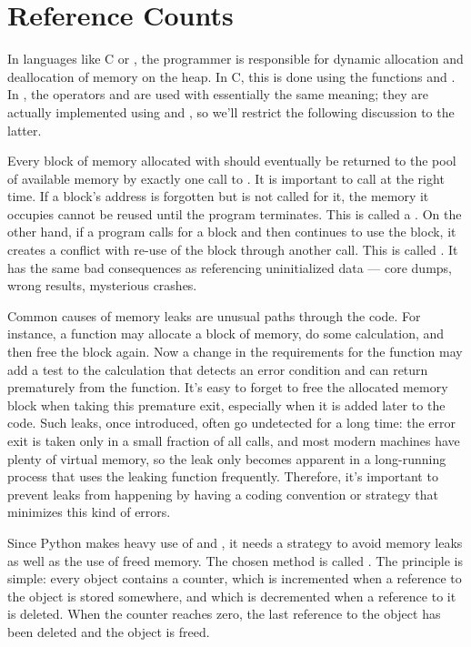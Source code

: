 \documentclass{manual}
\begin{document}
\section{Reference Counts
         \label{refcounts}}

In languages like C or \Cpp{}, the programmer is responsible for
dynamic allocation and deallocation of memory on the heap.  In C,
this is done using the functions  and
.  In \Cpp{}, the operators  and
 are used with essentially the same meaning; they are
actually implemented using  and
, so we'll restrict the following discussion to the
latter.

Every block of memory allocated with  should
eventually be returned to the pool of available memory by exactly one
call to .  It is important to call
 at the right time.  If a block's address is
forgotten but  is not called for it, the memory it
occupies cannot be reused until the program terminates.  This is
called a .  On the other hand, if a program calls
 for a block and then continues to use the block, it
creates a conflict with re-use of the block through another
 call.  This is called .
It has the same bad consequences as referencing uninitialized data ---
core dumps, wrong results, mysterious crashes.

Common causes of memory leaks are unusual paths through the code.  For
instance, a function may allocate a block of memory, do some
calculation, and then free the block again.  Now a change in the
requirements for the function may add a test to the calculation that
detects an error condition and can return prematurely from the
function.  It's easy to forget to free the allocated memory block when
taking this premature exit, especially when it is added later to the
code.  Such leaks, once introduced, often go undetected for a long
time: the error exit is taken only in a small fraction of all calls,
and most modern machines have plenty of virtual memory, so the leak
only becomes apparent in a long-running process that uses the leaking
function frequently.  Therefore, it's important to prevent leaks from
happening by having a coding convention or strategy that minimizes
this kind of errors.

Since Python makes heavy use of  and
, it needs a strategy to avoid memory leaks as well
as the use of freed memory.  The chosen method is called
.  The principle is simple: every object
contains a counter, which is incremented when a reference to the
object is stored somewhere, and which is decremented when a reference
to it is deleted.  When the counter reaches zero, the last reference
to the object has been deleted and the object is freed.
\end{document}
